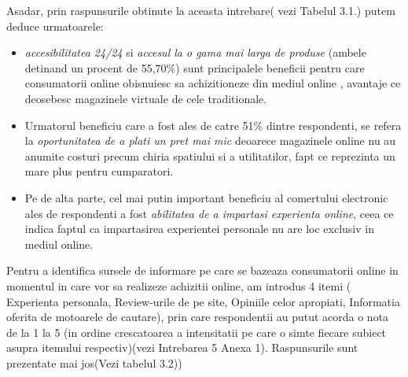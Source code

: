 \documentclass[a4paper, 12pt]{article}
\begin{document}
\begin{enumerate}[(A)]
	\qquad Asadar, prin raspunsurile obtinute la aceasta intrebare( vezi Tabelul 3.1.) putem deduce urmatoarele:
	\begin{itemize}
		\item \textit{accesibilitatea 24/24} si \textit{accesul la o gama mai larga de produse}  (ambele detinand un procent de 55,70\%) sunt principalele beneficii pentru care consumatorii online obisnuiesc sa achizitioneze din mediul online , avantaje ce deosebesc magazinele virtuale de cele traditionale.
		\item Urmatorul beneficiu care a fost ales de catre 51\% dintre respondenti, se refera la \textit{oportunitatea de a plati un pret mai mic} deoarece magazinele online nu au anumite costuri precum chiria spatiului si a utilitatilor, fapt ce reprezinta un mare plus pentru cumparatori.
		\item  Pe de alta parte, cel mai putin important beneficiu al comertului electronic ales de respondenti a fost \textit{abilitatea de a impartasi experienta online}, ceea ce indica faptul ca impartasirea experientei personale nu are loc exclusiv in mediul online.
	\end{itemize}
	
	\qquad Pentru a identifica sursele de informare pe care se bazeaza consumatorii online in momentul in care vor sa realizeze achizitii online, am introdus 4 itemi ( Experienta personala, Review-urile de pe site, Opiniile celor apropiati, Informatia oferita de motoarele de cautare), prin care respondentii au putut acorda o nota de la 1 la 5 (in ordine crescatoarea a intensitatii pe care o simte fiecare subiect asupra itemului respectiv)(vezi Intrebarea 5 Anexa 1). Raspunsurile sunt prezentate mai jos(Vezi tabelul 3.2))
	

\end{enumerate}
\end{document}
